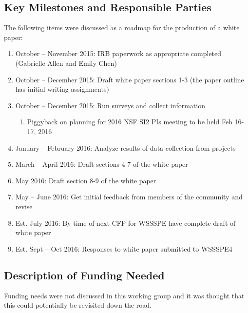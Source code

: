 \subsection{Key Milestones and Responsible Parties}

The following items were discussed as a roadmap for the production of a white paper:

\begin{enumerate}
\item
October -- November 2015: IRB paperwork as appropriate completed (Gabrielle Allen and Emily Chen)

\item
October -- December 2015: Draft white paper sections 1-3 (the paper outline has initial writing assignments)

\item
October -- December 2015: Run surveys and collect information

\begin{enumerate}
\item
        Piggyback on planning for 2016 NSF SI2 PIs meeting to be held Feb 16-17, 2016
\end{enumerate}

\item
January -- February 2016: Analyze results of data collection from projects

\item
March -- April 2016: Draft sections 4-7 of the white paper

\item
May 2016: Draft section 8-9 of the white paper

\item
May -- June 2016: Get initial feedback from members of the community and revise

\item
Est. July 2016: By time of next CFP for WSSSPE have complete draft of white paper

\item
Est. Sept -- Oct 2016: Responses to white paper submitted to WSSSPE4

\end{enumerate}


\subsection{Description of Funding Needed}

Funding needs were not discussed in this working group and it was thought that this could potentially be revisited down the road.



